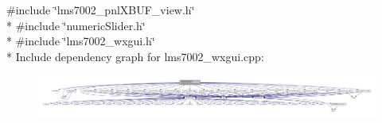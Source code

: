 {\ttfamily \#include \char`\"{}lms7002\+\_\+pnl\+X\+B\+U\+F\+\_\+view.\+h\char`\"{}}\\*
{\ttfamily \#include \char`\"{}numeric\+Slider.\+h\char`\"{}}\\*
{\ttfamily \#include \char`\"{}lms7002\+\_\+wxgui.\+h\char`\"{}}\\*
Include dependency graph for lms7002\+\_\+wxgui.\+cpp\+:
\nopagebreak
\begin{figure}[H]
\begin{center}
\leavevmode
\includegraphics[width=350pt]{d4/d6b/lms7002__wxgui_8cpp__incl}
\end{center}
\end{figure}
